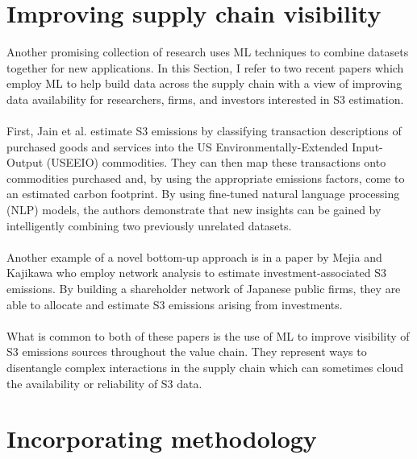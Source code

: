 \documentclass[12pt,twoside]{report}
\begin{document}
\section{Improving supply chain visibility}\label{sec:FurtherApplication2}

Another promising collection of research uses ML techniques to combine datasets together for new applications. In this Section, I refer to two recent papers which employ ML to help build data across the supply chain with a view of improving data availability for researchers, firms, and investors interested in S3 estimation. 
\\\\
First, Jain et al. \cite{jain2023} estimate S3 emissions by classifying transaction descriptions of purchased goods and services into the US Environmentally-Extended Input-Output (USEEIO) commodities. They can then map these transactions onto commodities purchased and, by using the appropriate emissions factors, come to an estimated carbon footprint. By using fine-tuned natural language processing (NLP) models, the authors demonstrate that new insights can be gained by intelligently combining two previously unrelated datasets. 
\\\\
Another example of a novel bottom-up approach is in a paper by Mejia and Kajikawa \cite{Mejia2024} who employ network analysis to estimate investment-associated S3 emissions. By building a shareholder network of Japanese public firms, they are able to allocate and estimate S3 emissions arising from investments. 
\\\\
What is common to both of these papers is the use of ML to improve visibility of S3 emissions sources throughout the value chain. They represent ways to disentangle complex interactions in the supply chain which can sometimes cloud the availability or reliability of S3 data. 

\section{Incorporating methodology}\label{sec:IncorporatingMethodology}
\end{document}
